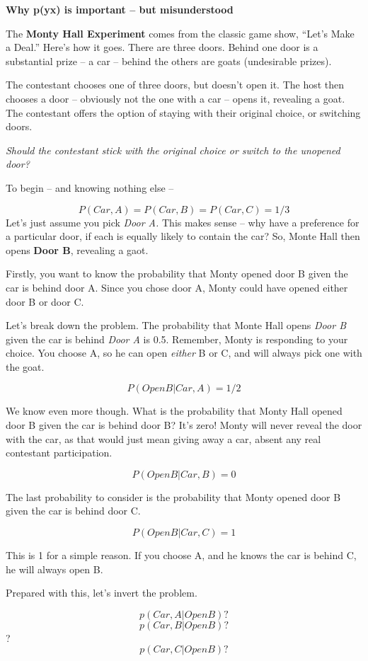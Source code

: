 \documentclass[
]{book}
\begin{document}
\textbf{Why p(y\textbar x) is important -- but misunderstood}

The \textbf{Monty Hall Experiment} comes from the classic game show, ``Let's Make a Deal.'' Here's how it goes. There are three doors. Behind one door is a substantial prize -- a car -- behind the others are goats (undesirable prizes).

The contestant chooses one of three doors, but doesn't open it. The host then chooses a door -- obviously not the one with a car -- opens it, revealing a goat. The contestant offers the option of staying with their original choice, or switching doors.

\emph{Should the contestant stick with the original choice or switch to the unopened door?}

To begin -- and knowing nothing else --

\[ P(Car, A) = P(Car, B) = P(Car, C)=1/3\] Let's just assume you pick \emph{Door A.} This makes sense -- why have a preference for a particular door, if each is equally likely to contain the car? So, Monte Hall then opens \textbf{Door B}, revealing a gaot.

Firstly, you want to know the probability that Monty opened door B given the car is behind door A. Since you chose door A, Monty could have opened either door B or door C.

Let's break down the problem. The probability that Monte Hall opens \emph{Door B} given the car is behind \emph{Door A} is 0.5. Remember, Monty is responding to your choice. You choose A, so he can open \emph{either} B or C, and will always pick one with the goat.

\[ P(OpenB | Car, A) = 1/2\]

We know even more though. What is the probability that Monty Hall opened door B given the car is behind door B? It's zero! Monty will never reveal the door with the car, as that would just mean giving away a car, absent any real contestant participation.

\[ P(OpenB | Car, B) = 0\]

The last probability to consider is the probability that Monty opened door B given the car is behind door C.

\[ P(OpenB | Car, C) = 1 \]

This is 1 for a simple reason. If you choose A, and he knows the car is behind C, he will always open B.

Prepared with this, let's invert the problem.

\[p(Car,A|OpenB)?\] \[p(Car,B|OpenB)?\]? \[p(Car,C|OpenB)?\]
\end{document}
